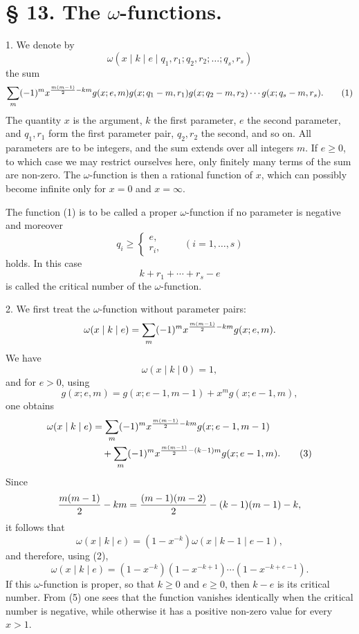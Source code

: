 \section*{§ 13. The $\omega$-functions.}

1. We denote by
\[
 \omega(x\mid k\mid e\mid q_1,r_1;q_2,r_2;\ldots;q_s,r_s)
\]
the sum
\begin{equation}
 \sum_m(-1)^m x^{{m(m-1)\over2}-km}
 g(x;e,m)g(x;q_1-m,r_1)g(x;q_2-m,r_2)\cdots g(x;q_s-m,r_s).
\tag{1}
\end{equation}
The quantity $x$ is the argument, $k$ the first parameter, $e$ the second parameter, and $q_1,r_1$ form the first parameter pair, $q_2,r_2$ the second, and so on. All parameters are to be integers, and the sum extends over all integers $m$. If $e\ge0$, to which case we may restrict ourselves here, only finitely many terms of the sum are non-zero. The $\omega$-function is then a rational function of $x$, which can possibly become infinite only for $x=0$ and $x=\infty$.

The function (1) is to be called a proper $\omega$-function if no parameter is negative and moreover
\[
 q_i\ge \begin{cases}e,\\ r_i,
 \end{cases}\qquad(i=1,\ldots,s)
\]
holds. In this case
\[
 k+r_1+\cdots+r_s-e
\]
is called the critical number of the $\omega$-function.

2. We first treat the $\omega$-function without parameter pairs:
\[
 \omega(x\mid k\mid e)=\sum_m(-1)^m x^{{m(m-1)\over2}-km}g(x;e,m).
\]
We have
\begin{equation}
 \omega(x\mid k\mid0)=1,
\tag{2}
\end{equation}
and for $e>0$, using
\[
 g(x;e,m)=g(x;e-1,m-1)+x^m g(x;e-1,m),
\]
one obtains
\begin{align}
\omega(x\mid k\mid e)
&=\sum_m(-1)^m x^{{m(m-1)\over2}-km}g(x;e-1,m-1)\notag\\
&\quad+\sum_m(-1)^m x^{{m(m-1)\over2}-(k-1)m}g(x;e-1,m).
\tag{3}
\end{align}
Since
\[
 {m(m-1)\over2}-km={(m-1)(m-2)\over2}-(k-1)(m-1)-k,
\]
it follows that
\begin{equation}
 \omega(x\mid k\mid e)=(1-x^{-k})\omega(x\mid k-1\mid e-1),
\tag{4}
\end{equation}
and therefore, using (2),
\begin{equation}
 \omega(x\mid k\mid e)=(1-x^{-k})(1-x^{-k+1})\cdots(1-x^{-k+e-1}).
\tag{5}
\end{equation}
If this $\omega$-function is proper, so that $k\ge0$ and $e\ge0$, then $k-e$ is its critical number. From (5) one sees that the function vanishes identically when the critical number is negative, while otherwise it has a positive non-zero value for every $x>1$.

